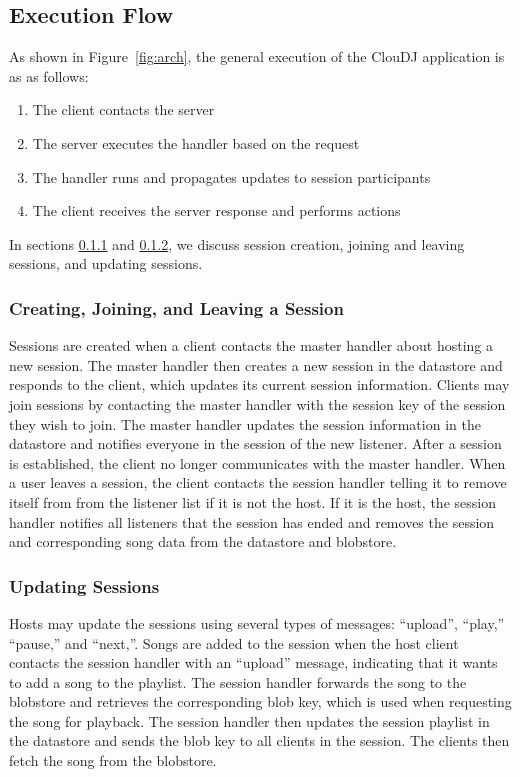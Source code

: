 \subsection{Execution Flow}
\label{sec:execution}
As shown in Figure~\ref{fig:arch}, the general execution of the ClouDJ application
is as as follows:
\begin{enumerate}
  \item The client contacts the server
  \item The server executes the handler based on the request
  \item The handler runs and propagates updates to session participants
  \item The client receives the server response and performs actions 
\end{enumerate}

In sections \ref{sec:joinSession} and \ref{sec:playSession}, we discuss
session creation, joining and leaving sessions, and updating sessions.


\subsubsection{Creating, Joining, and Leaving a Session}
\label{sec:joinSession}
Sessions are created when a client contacts the master 
handler about hosting a new session. The master handler 
then creates a new session in the datastore and responds to the client, 
which updates its current session information. 
Clients may join sessions by contacting the master 
handler with the session key of the session they wish to join. 
The master handler updates the session information in the datastore
and notifies everyone in the session of the new listener. 
After a session is established, the client no longer communicates 
with the master handler. When a user leaves a session, the client
contacts the session handler telling it to remove itself from from
the listener list if it is not the host. If it is the host, the
session handler notifies all listeners that the session has ended and 
removes the session and corresponding song data from the datastore
and blobstore.

\subsubsection{Updating Sessions}
\label{sec:playSession}
Hosts may update the sessions using several types of messages: ``upload'',
``play,'' ``pause,'' and ``next,''. Songs are added to the session when 
the host client contacts the session handler with an ``upload'' message, 
indicating that it wants to add a song to the playlist. The session 
handler forwards the song to the blobstore and retrieves the corresponding 
blob key, which is used when requesting the song for playback. The session
handler then updates the session playlist in the datastore and sends the 
blob key to all clients in the session. The clients then fetch the song 
from the blobstore. 

